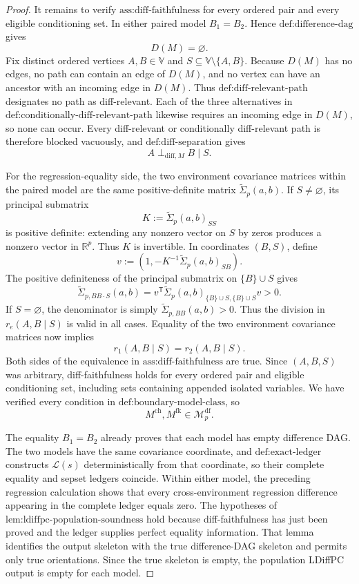 \documentclass{article}
\begin{document}
\begin{proof}
It remains to verify \(\text{ass:diff-faithfulness}\) for every ordered pair and every eligible conditioning set. In either paired model \(B_1=B_2\). Hence \(\text{def:difference-dag}\) gives
\[
 D(M)=\varnothing.
\]
Fix distinct ordered vertices \(A,B\in\mathbb V\) and \(S\subseteq\mathbb V\setminus\{A,B\}\). Because \(D(M)\) has no edges, no path can contain an edge of \(D(M)\), and no vertex can have an ancestor with an incoming edge in \(D(M)\). Thus \(\text{def:diff-relevant-path}\) designates no path as diff-relevant. Each of the three alternatives in \(\text{def:conditionally-diff-relevant-path}\) likewise requires an incoming edge in \(D(M)\), so none can occur. Every diff-relevant or conditionally diff-relevant path is therefore blocked vacuously, and \(\text{def:diff-separation}\) gives
\[
 A\perp_{\mathrm{diff},M}B\mid S.
\]

For the regression-equality side, the two environment covariance matrices within the paired model are the same positive-definite matrix \(\widetilde\Sigma_p(a,b)\). If \(S\neq\varnothing\), its principal submatrix
\[
 K:=\widetilde\Sigma_p(a,b)_{SS}
\]
is positive definite: extending any nonzero vector on \(S\) by zeros produces a nonzero vector in \(\mathbb R^p\). Thus \(K\) is invertible. In coordinates \((B,S)\), define
\[
 v:=\left(1,-K^{-1}\widetilde\Sigma_p(a,b)_{SB}\right).
\]
The positive definiteness of the principal submatrix on \(\{B\}\cup S\) gives
\[
 \widetilde\Sigma_{p,BB\cdot S}(a,b)
 =v^{\mathsf T}
 \widetilde\Sigma_p(a,b)_{\{B\}\cup S,\{B\}\cup S}v>0.
\]
If \(S=\varnothing\), the denominator is simply \(\widetilde\Sigma_{p,BB}(a,b)>0\). Thus the division in \(r_e(A,B\mid S)\) is valid in all cases. Equality of the two environment covariance matrices now implies
\[
 r_1(A,B\mid S)=r_2(A,B\mid S).
\]
Both sides of the equivalence in \(\text{ass:diff-faithfulness}\) are true. Since \((A,B,S)\) was arbitrary, diff-faithfulness holds for every ordered pair and eligible conditioning set, including sets containing appended isolated variables. We have verified every condition in \(\text{def:boundary-model-class}\), so
\[
 M^{\mathrm{ch}},M^{\mathrm{fk}}\in\mathcal M_p^{\mathrm{df}}.
\]

The equality \(B_1=B_2\) already proves that each model has empty difference DAG. The two models have the same covariance coordinate, and \(\text{def:exact-ledger}\) constructs \(\mathcal L(s)\) deterministically from that coordinate, so their complete equality and sepset ledgers coincide. Within either model, the preceding regression calculation shows that every cross-environment regression difference appearing in the complete ledger equals zero. The hypotheses of \(\text{lem:ldiffpc-population-soundness}\) hold because diff-faithfulness has just been proved and the ledger supplies perfect equality information. That lemma identifies the output skeleton with the true difference-DAG skeleton and permits only true orientations. Since the true skeleton is empty, the population LDiffPC output is empty for each model.


\end{proof}
\end{document}
